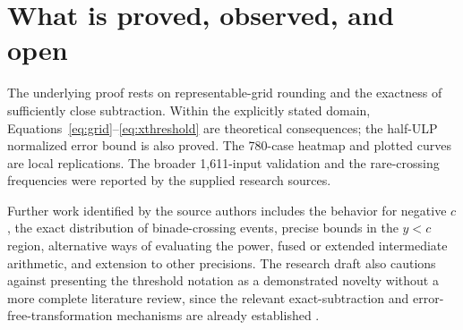 \section{What is proved, observed, and open}
The underlying proof rests on representable-grid rounding and the exactness of sufficiently close subtraction. Within the explicitly stated domain, Equations~\eqref{eq:grid}--\eqref{eq:xthreshold} are theoretical consequences; the half-ULP normalized error bound is also proved. The 780-case heatmap and plotted curves are local replications. The broader 1,611-input validation and the rare-crossing frequencies were reported by the supplied research sources.

Further work identified by the source authors includes the behavior for negative $c$, the exact distribution of binade-crossing events, precise bounds in the $y<c$ region, alternative ways of evaluating the power, fused or extended intermediate arithmetic, and extension to other precisions. The research draft also cautions against presenting the threshold notation as a demonstrated novelty without a more complete literature review, since the relevant exact-subtraction and error-free-transformation mechanisms are already established \cite{rocha2026bookdraft}.
